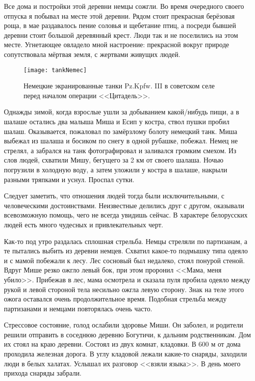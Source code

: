 Все дома и постройки этой деревни немцы сожгли. Во время очередного своего отпуска я побывал на месте этой деревни. Рядом стоит прекрасная берёзовая роща, в мае раздавалось пение соловья и щебетание птиц, а посреди бывшей деревни стоит большой деревянный крест. Люди так и не поселились на этом месте. Угнетающее овладело мной настроение: прекрасной вокруг природе сопутствовала мёртвая земля, с жертвами живущих людей. 

\begin{wrapfigure}{O}{.4\textwidth}
\centering
\texttt{[image: tankNemec]}
\caption{Немецкие экранированные танки Pz.Kpfw. III в советском селе перед началом операции <<Цитадель>>.}
\label{fig:tankNemec}
\end{wrapfigure}

Однажды зимой, когда взрослые ушли за добыванием какой\-/нибудь пищи, а в шалаше остались два малыша Миша и Есип у костра, ствол пушки пробил шалаш. Оказывается, пожаловал по замёрзлому болоту немецкий танк. Миша выбежал из шалаша и босиком по снегу в одной рубашке, побежал. Немец не стрелял, а забрался на танк фотографировал и заливался громким смехом. Из слов людей, схватили Мишу, бегущего за 2 км от своего шалаша. Ночью погрузили в холодную воду, а затем уложили у костра в шалаше, накрыли разными тряпками и уснул. Проспал сутки. 

Следует заметить, что отношения людей тогда были исключительными, с человеческими достоинствами. Неизвестные делились друг с другом, оказывали всевозможную помощь, чего не всегда увидишь сейчас. В характере белорусских людей есть много чудесных и привлекательных черт. 

Как-то под утро раздалась сплошная стрельба. Немцы стреляли по партизанам, а те пытались выбить из деревни немцев. Схватил какое-то подмышку типа одеяло и с мамой побежали к лесу. Лес сосновый был недалеко, стоял понурой стеной. Вдруг Мише резко ожгло левый бок, при этом проронил <<Мама, меня убило>>. Прибежав в лес, мама осмотрела и сказала пуля пробила одеяло между рукой и левой стороной тела несильно ожгла левую сторону. Знак на теле этого ожога оставался очень продолжительное время. Подобная стрельба между партизанами и немцами повторялась очень часто.

Стрессовое состояние, голод ослабили здоровье Миши. Он заболел, и родители решили отправить в соседнюю деревню Богутичи, к дальним родственникам. Дом их стоял на краю деревни. Состоял из двух комнат, кладовки. В 600 м от дома проходила железная дорога. В углу кладовой лежали какие-то снаряды, заходили люди в белых халатах. Услышал их разговор <<взяли языка>>. В день моего прихода снаряды забрали. 

